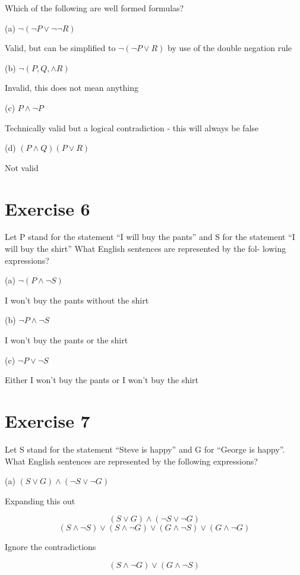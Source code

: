 \documentclass[11pt]{article}
\begin{document}
Which of the following are well formed formulas?

\noindent (a) $\neg (\neg P \vee \neg \neg R) $

Valid, but can be simplified to $\neg (\neg P \vee R)$ by use of the double negation rule

\noindent (b) $\neg (P, Q, \wedge R)$

Invalid, this does not mean anything

\noindent (c) $P \wedge \neg P$

Technically valid but a logical contradiction - this will always be false

\noindent (d) $ (P \wedge Q)(P \vee R) $

Not valid

\section*{Exercise 6}

Let P stand for the statement ``I will buy the pants'' and S for the statement ``I will buy the shirt'' What English sentences are represented by the fol-
lowing expressions?

\noindent (a) $ \neg (P \wedge \neg S) $

I won't buy the pants without the shirt

\noindent (b) $ \neg P \wedge \neg S $

I won't buy the pants or the shirt

\noindent (c) $ \neg P \vee \neg S $

Either I won't buy the pants or I won't buy the shirt

\section*{Exercise 7}

Let S stand for the statement ``Steve is happy'' and G for ``George is happy''. What English sentences are represented by the following expressions?

\noindent (a) $ (S \vee G) \wedge (\neg S \vee \neg G) $

Expanding this out

$$ (S \vee G) \wedge (\neg S \vee \neg G) $$
$$ (S \wedge \neg S) \vee (S \wedge \neg G) \vee (G \wedge \neg S) \vee (G \wedge \neg G) $$

Ignore the contradictions

$$ (S \wedge \neg G) \vee (G \wedge \neg S) $$
\end{document}
